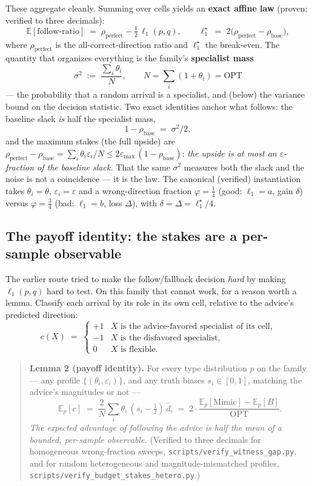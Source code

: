 These aggregate cleanly. Summing over cells yields an \textbf{exact
affine law} (proven; verified to three decimals):
\[\mathbb E[\text{follow-ratio}] \;=\; \rho_{\mathrm{perfect}} - \tfrac12\,\ell_1(p,q),
\qquad \ell_1^\star \;=\; 2\big(\rho_{\mathrm{perfect}}-\rho_{\mathrm{base}}\big),\]
where \(\rho_{\mathrm{perfect}}\) is the all-correct-direction ratio and
\(\ell_1^\star\) the break-even. The quantity that organizes everything
is the family's \textbf{specialist mass}
\[\sigma^2 \;:=\; \frac{\sum_i \theta_i}{N}, \qquad N=\sum_i(1+\theta_i)=\mathrm{OPT}\]
--- the probability that a random arrival is a specialist, and (below)
the variance bound on the decision statistic. Two exact identities
anchor what follows: the baseline slack \emph{is} half the specialist
mass, \[1-\rho_{\mathrm{base}} \;=\; \sigma^2/2,\] and the maximum
stakes (the full upside) are
\(\rho_{\mathrm{perfect}}-\rho_{\mathrm{base}} = \sum_i\theta_i\varepsilon_i/N
\le 2\varepsilon_{\max}\,(1-\rho_{\mathrm{base}})\): \emph{the upside is
at most an \(\varepsilon\)-fraction of the baseline slack.} That the
same \(\sigma^2\) measures both the slack and the noise is not a
coincidence --- it is the law. The canonical (verified) instantiation
takes \(\theta_i=\theta\), \(\varepsilon_i=\varepsilon\) and a
wrong-direction fraction \(\varphi=\tfrac14\) (good: \(\ell_1 = a\),
gain \(\delta\)) versus \(\varphi=\tfrac34\) (bad: \(\ell_1 = b\), loss
\(\Delta\)), with \(\delta=\Delta=\ell_1^\star/4\).

\subsection{The payoff identity: the stakes are a per-sample
observable}

The earlier route tried to make the follow/fallback decision \emph{hard}
by making \(\ell_1(p,q)\) hard to test. On this family that cannot work,
for a reason worth a lemma. Classify each arrival by its role in its own
cell, relative to the advice's predicted direction:
\[c(X) \;=\; \begin{cases} +1 & X \text{ is the advice-favored specialist of its cell,} \\
-1 & X \text{ is the disfavored specialist,} \\ 0 & X \text{ is flexible.}\end{cases}\]

\begin{quote}
\textbf{Lemma 2 (payoff identity).} For every type distribution \(p\) on
the family --- any profile \(\{(\theta_i,\varepsilon_i)\}\), and any
truth biases \(s_i\in[0,1]\), matching the advice's magnitudes or not
---
\[\mathbb E_p[c] \;=\; \frac2N\sum_i \theta_i\,(s_i-\tfrac12)\,\hat d_i
\;=\; 2\cdot\frac{\mathbb E_p[\mathrm{Mimic}]-\mathbb E_p[B]}{\mathrm{OPT}}.\]
\emph{The expected advantage of following the advice is half the mean of
a bounded, per-sample observable.} (Verified to three decimals for
homogeneous wrong-fraction sweeps,
\texttt{scripts/verify\_witness\_gap.py}, and for random heterogeneous
and magnitude-mismatched profiles,
\texttt{scripts/verify\_budget\_stakes\_hetero.py}.)
\end{quote}

